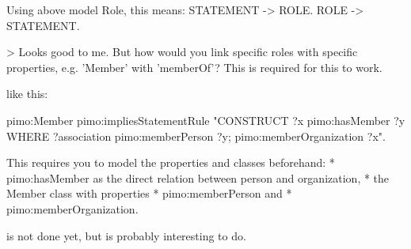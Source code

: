Using above model Role, this means:
STATEMENT -> ROLE.
ROLE -> STATEMENT.

> Looks good to me. But how would you link specific roles with specific properties, e.g. 'Member' with 'memberOf'? This is required for this to work.

like this:

pimo:Member pimo:impliesStatementRule
 "CONSTRUCT {?x pimo:hasMember ?y} WHERE {?association pimo:memberPerson ?y; pimo:memberOrganization ?x}".

This requires you to model the properties and classes beforehand:
* pimo:hasMember as the direct relation between person and organization,
* the Member class with properties
* pimo:memberPerson and
* pimo:memberOrganization.

is not done yet, but is probably interesting to do. 
